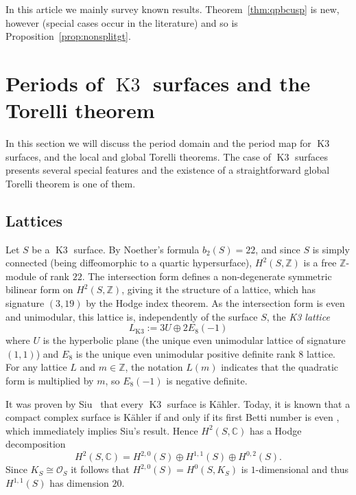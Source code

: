 \documentclass[a4paper,11pt]{article}
\newcommand{\CC}{\mathbb C}
\newcommand{\ZZ}{\mathbb Z}
\newcommand{\cO}{\mathcal O}
\newcommand{\imic}{\cong}
\newcommand{\Kthree}{\mathop{\mathrm {K3}}\nolimits}
\begin{document}
In this article we mainly survey known
results. Theorem~\ref{thm:qpbcusp} is new, however (special cases
occur in the literature) and so is Proposition~\ref{prop:nonsplitgt}.

\section{Periods of $\Kthree$ surfaces and the Torelli
  theorem}\label{sect:K3periods}
In this section we will discuss the period domain and the period map
for $\Kthree$ surfaces, and the local and global Torelli theorems. The
case of $\Kthree$ surfaces presents several special features and the
existence of a straightforward global Torelli theorem is one of them.

\subsection{Lattices}\label{subsect:lattices}
Let $S$ be a $\Kthree$ surface. By Noether's formula $b_2(S)=22$, and
since $S$ is simply connected (being diffeomorphic to a quartic
hypersurface), $H^2(S,\ZZ)$ is a free $\ZZ$-module of rank $22$.  The
intersection form defines a non-degenerate symmetric bilinear form on
$H^2(S,\ZZ)$, giving it the structure of a lattice, which has
signature $(3,19)$ by the Hodge index theorem. As the intersection
form is even and unimodular, this lattice is, independently of the
surface $S$, the \emph{K3 lattice}
\begin{equation}\label{K3lattice}
L_{\Kthree}:=3U \oplus 2E_8(-1)
\end{equation}
where $U$ is the hyperbolic plane (the unique even unimodular lattice
of signature $(1,1)$) and $E_8$ is the unique even unimodular positive
definite rank $8$ lattice.  For any lattice $L$ and $m\in\ZZ$, the
notation $L(m)$ indicates that the quadratic form is multiplied by
$m$, so $E_8(-1)$ is negative definite. 

It was proven by Siu~\cite{Siu} that every $\Kthree$ surface is
K\"ahler. Today, it is known that a compact complex surface is
K\"ahler if and only if its first Betti number is even \cite[Theorem
  IV.3.1]{BHPV}, which immediately implies Siu's result. Hence
$H^2(S,\CC)$ has a Hodge decomposition
\begin{equation*}
H^2(S,\CC)=H^{2,0}(S) \oplus H^{1,1}(S) \oplus H^{0,2}(S).
\end{equation*}
Since $K_S\imic\cO_S$ it follows that $H^{2,0}(S)=H^0(S,K_S)$ is
$1$-dimensional and thus $H^{1,1}(S)$ has dimension $20$.
\end{document}
